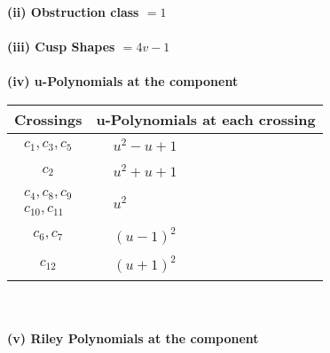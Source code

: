 \documentclass[1p]{elsarticle_modified}
\theoremstyle{definition}
\begin{document}
\flushleft \textbf{(ii) Obstruction class $= 1$}\\~\\
\flushleft \textbf{(iii) Cusp Shapes $= 4 v-1$}\\~\\
\newpage\renewcommand{\arraystretch}{1}
\flushleft \textbf{(iv) u-Polynomials at the component}\newline \\
\begin{tabular}{m{50pt}|m{274pt}}
Crossings & \hspace{64pt}u-Polynomials at each crossing \\
\hline $$\begin{aligned}c_{1},c_{3},c_{5}\end{aligned}$$&$\begin{aligned}
&u^2- u+1
\end{aligned}$\\
\hline $$\begin{aligned}c_{2}\end{aligned}$$&$\begin{aligned}
&u^2+u+1
\end{aligned}$\\
\hline $$\begin{aligned}c_{4},c_{8},c_{9}\\c_{10},c_{11}\end{aligned}$$&$\begin{aligned}
&u^2
\end{aligned}$\\
\hline $$\begin{aligned}c_{6},c_{7}\end{aligned}$$&$\begin{aligned}
&(u-1)^2
\end{aligned}$\\
\hline $$\begin{aligned}c_{12}\end{aligned}$$&$\begin{aligned}
&(u+1)^2
\end{aligned}$\\
\hline
\end{tabular}\\~\\
\newpage\renewcommand{\arraystretch}{1}
\flushleft \textbf{(v) Riley Polynomials at the component}\newline \\
\end{document}
